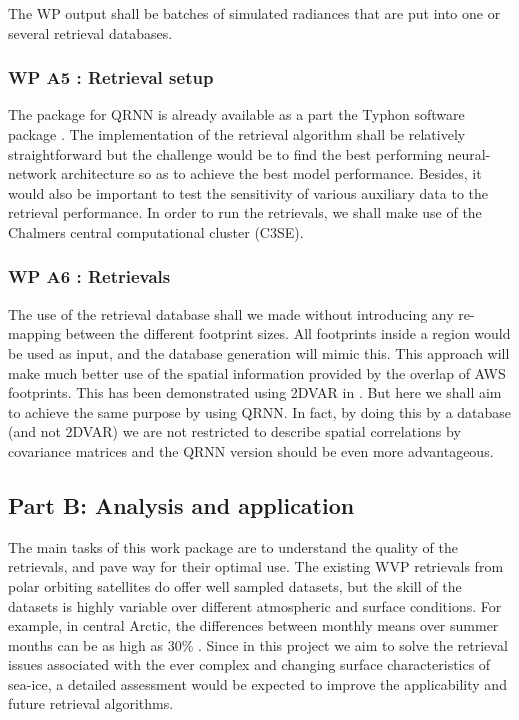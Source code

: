 \documentclass[12pt,oneside,a4paper]{article}
\begin{document}
The WP output shall be batches of simulated radiances that are put into one or several retrieval databases. 

\subsubsection*{WP A5 : Retrieval setup}
%
The package for QRNN is already available as a part the Typhon software package \citep{lemke:2020:typho}. The implementation of the retrieval algorithm shall be relatively straightforward but the challenge would be to find the best performing neural-network architecture so as to achieve the best model performance. Besides, it would also be important to test the sensitivity of various auxiliary data to the retrieval performance. In order to run the retrievals, we shall make use of the Chalmers central computational cluster (C3SE).

\subsubsection*{WP A6 : Retrievals}
%
The use of the retrieval database shall we made without introducing any re-mapping between the different footprint sizes. All footprints inside a region would be used as input, and the database generation will mimic this. This approach will make much better use of
the spatial information provided by the overlap of AWS footprints. This has been demonstrated using 2DVAR in \citep{duncan:onthe:19}. But here we shall aim to achieve the same purpose by using QRNN. In fact, by doing this by a database (and not 2DVAR) we are not restricted to describe spatial correlations by covariance matrices and the QRNN version should be even more advantageous.

\subsection{Part B: Analysis and application}

The main tasks of this work package are to understand the quality of the retrievals, and pave way for their optimal use. The existing WVP retrievals from polar orbiting satellites do offer well sampled datasets, but the skill of the datasets is highly variable over different atmospheric and surface conditions. For example, in central Arctic, the differences between monthly means over summer months can be as high as 30\% \citep{crewell:2021:asyst}. Since in this project we aim to solve the retrieval issues associated with the ever complex and changing surface characteristics of sea-ice, a detailed assessment would be expected to improve the applicability and future retrieval algorithms.
\end{document}
